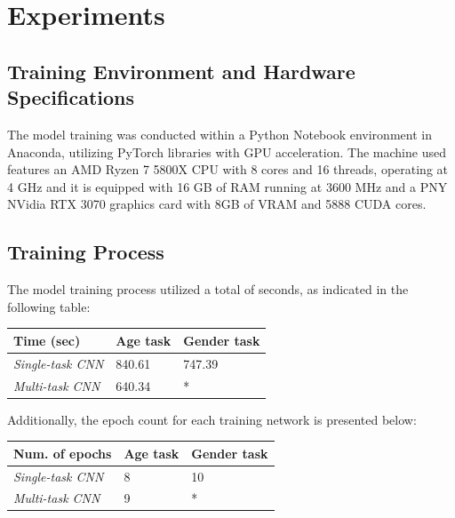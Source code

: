 \section{Experiments} \label{sec:experiments}

\subsection{Training Environment and Hardware Specifications}

The model training was conducted within a Python Notebook environment
in Anaconda, utilizing PyTorch libraries with GPU acceleration.
The machine used features an AMD Ryzen 7 5800X CPU with 8 cores and
16 threads, operating at 4 GHz and
it is equipped with 16 GB of RAM running at 3600 MHz
and a PNY NVidia RTX 3070 graphics card with 8GB
of VRAM and 5888 CUDA cores.

\subsection{Training Process}

The model training process utilized a total of seconds,
as indicated in the following table:
\begin{table}[H]
    \centering
    \begin{tabular}{@{}lll@{}}
    \toprule
    Time (sec)               & \textbf{Age task} & \textbf{Gender task} \\ \midrule
    \textit{Single-task CNN} &  840.61           & 747.39               \\
    \textit{Multi-task CNN}  &  640.34           & *                    \\ \bottomrule
    \end{tabular}
\end{table}

Additionally, the epoch count for each training network is presented below:
\begin{table}[H]
    \centering
    \begin{tabular}{@{}lll@{}}
    \toprule
    Num. of epochs           & \textbf{Age task} & \textbf{Gender task} \\ \midrule
    \textit{Single-task CNN} & 8                 & 10                   \\
    \textit{Multi-task CNN}  & 9                 & *                    \\ \bottomrule
    \end{tabular}
\end{table}

